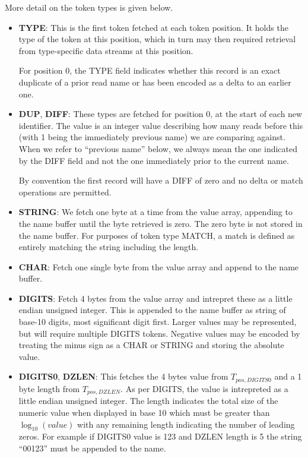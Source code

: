 \documentclass[a4paper]{article}
\begin{document}
More detail on the token types is given below.

\begin{itemize}
\item{\textbf{TYPE}:}
This is the first token fetched at each token position.  It holds the
type of the token at this position, which in turn may then required
retrieval from type-specific data streams at this position.

For position 0, the TYPE field indicates whether this record is an
exact duplicate of a prior read name or has been encoded as a delta to
an earlier one.
  
\item{\textbf{DUP}, \textbf{DIFF}:}
These types are fetched for position 0, at the start of each new
identifier.  The value is an integer value describing how many reads
before this (with 1 being the immediately previous name) we are
comparing against.  When we refer to ``previous name'' below, we
always mean the one indicated by the DIFF field and not the one
immediately prior to the current name.

By convention the first record will have a DIFF of zero and no delta
or match operations are permitted.

\item{\textbf{STRING}:}
We fetch one byte at a time from the value array, appending to the
name buffer until the byte retrieved is zero.  The zero byte is not
stored in the name buffer.
For purposes of token type MATCH, a match is defined as entirely
matching the string including the length.

\item{\textbf{CHAR}:}
Fetch one single byte from the value array and append to the name buffer.

\item{\textbf{DIGITS}:}
Fetch 4 bytes from the value array and intrepret these as a little
endian unsigned integer.  This is appended to the name buffer as
string of base-10 digits, most significant digit first.  Larger
values may be represented, but will require multiple DIGITS tokens.
Negative values may be encoded by treating the minus sign as a CHAR or
STRING and storing the absolute value.

\item{\textbf{DIGITS0}, \textbf{DZLEN}:}
This fetches the 4 bytes value from $T_{pos,DIGITS0}$ and a 1 byte
length from $T_{pos,DZLEN}$.  As per DIGITS, the value is intrepreted as a
little endian unsigned integer.  The length indicates the total
size of the numeric value when displayed in base 10 which must be
greater than $\log_{10}(value)$ with any remaining length indicating
the number of leading zeros.  For example if DIGITS0 value is 123 and
DZLEN length is 5 the string ``00123'' must be appended to the name.


\end{itemize}
\end{document}

